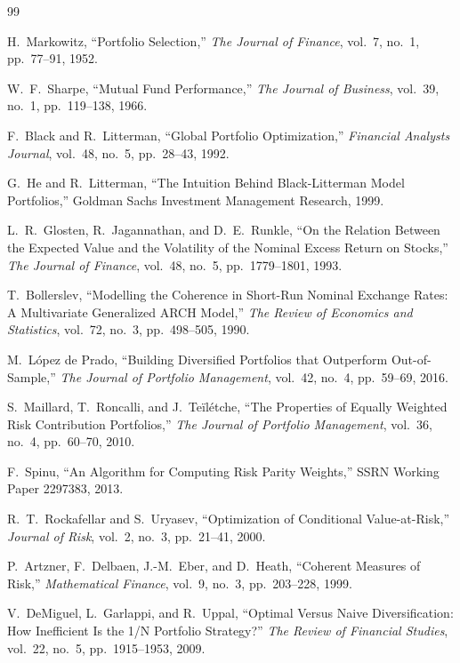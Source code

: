 \documentclass[12pt,a4paper]{article}
\begin{document}
\begin{thebibliography}{99}

H.~Markowitz, ``Portfolio Selection,''
\emph{The Journal of Finance}, vol.~7, no.~1, pp.~77--91, 1952.

W.~F.~Sharpe, ``Mutual Fund Performance,''
\emph{The Journal of Business}, vol.~39, no.~1, pp.~119--138, 1966.

F.~Black and R.~Litterman, ``Global Portfolio Optimization,''
\emph{Financial Analysts Journal}, vol.~48, no.~5, pp.~28--43, 1992.

G.~He and R.~Litterman, ``The Intuition Behind Black-Litterman Model Portfolios,''
Goldman Sachs Investment Management Research, 1999.

L.~R.~Glosten, R.~Jagannathan, and D.~E.~Runkle,
``On the Relation Between the Expected Value and the Volatility of the Nominal Excess Return on Stocks,''
\emph{The Journal of Finance}, vol.~48, no.~5, pp.~1779--1801, 1993.

T.~Bollerslev, ``Modelling the Coherence in Short-Run Nominal Exchange Rates: A Multivariate Generalized ARCH Model,''
\emph{The Review of Economics and Statistics}, vol.~72, no.~3, pp.~498--505, 1990.

M.~L\'opez de Prado, ``Building Diversified Portfolios that Outperform Out-of-Sample,''
\emph{The Journal of Portfolio Management}, vol.~42, no.~4, pp.~59--69, 2016.

S.~Maillard, T.~Roncalli, and J.~Te\"il\'etche,
``The Properties of Equally Weighted Risk Contribution Portfolios,''
\emph{The Journal of Portfolio Management}, vol.~36, no.~4, pp.~60--70, 2010.

F.~Spinu, ``An Algorithm for Computing Risk Parity Weights,''
SSRN Working Paper 2297383, 2013.

R.~T.~Rockafellar and S.~Uryasev, ``Optimization of Conditional Value-at-Risk,''
\emph{Journal of Risk}, vol.~2, no.~3, pp.~21--41, 2000.

P.~Artzner, F.~Delbaen, J.-M.~Eber, and D.~Heath,
``Coherent Measures of Risk,''
\emph{Mathematical Finance}, vol.~9, no.~3, pp.~203--228, 1999.

V.~DeMiguel, L.~Garlappi, and R.~Uppal,
``Optimal Versus Naive Diversification: How Inefficient Is the 1/N Portfolio Strategy?''
\emph{The Review of Financial Studies}, vol.~22, no.~5, pp.~1915--1953, 2009.


\end{thebibliography}
\end{document}
